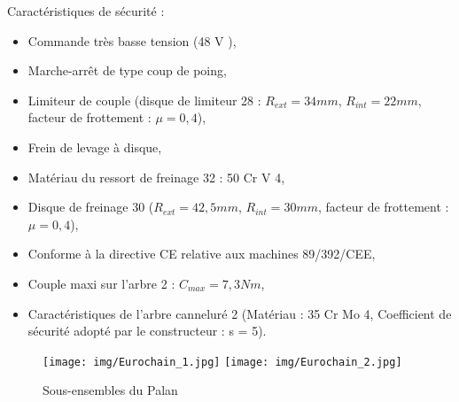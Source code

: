 Caractéristiques de sécurité :
\begin{itemize}
 \item Commande très basse tension (48 V ),
 \item Marche-arrêt de type coup de poing,
 \item Limiteur de couple (disque de limiteur 28 : $R_{ext}=34mm$, $R_{int}=22mm$, facteur de frottement : $\mu=0,4$),
 \item Frein de levage à disque,
 \item Matériau du ressort de freinage 32 : 50 Cr V 4,
 \item Disque de freinage 30 ($R_{ext}=42,5 mm$, $R_{int}=30mm$, facteur de frottement : $\mu=0,4$),
 \item Conforme à la directive CE relative aux machines 89/392/CEE,
 \item Couple maxi sur l'arbre 2 : $C_{max}=7,3Nm$,
 \item Caractéristiques de l'arbre canneluré 2 (Matériau : 35 Cr Mo 4, Coefficient de sécurité adopté par le constructeur : s = 5).
\end{itemize} 

\newpage


\begin{figure}[!h]
 \centering\texttt{[image: img/Eurochain\_1.jpg]}
 \centering\texttt{[image: img/Eurochain\_2.jpg]}
 \caption{Sous-ensembles du Palan}
 \label{fig5}
\end{figure}

